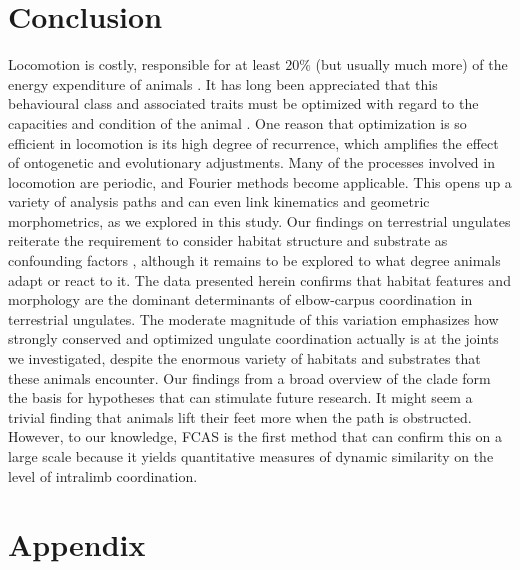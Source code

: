 \section{Conclusion}
Locomotion is costly, responsible for at least $20\%$ (but usually much more) of the energy expenditure of animals \citep{Rezende2009,Girard2001}.
It has long been appreciated that this behavioural class and associated traits must be optimized with regard to the capacities and condition of the animal \citep{Hoyt1981,Reilly2007}.
One reason that optimization is so efficient in locomotion is its high degree of recurrence, which amplifies the effect of ontogenetic and evolutionary adjustments.
Many of the processes involved in locomotion are periodic, and Fourier methods become applicable.
This opens up a variety of analysis paths and can even link kinematics and geometric morphometrics, as we explored in this study.
Our findings on terrestrial ungulates reiterate the requirement to consider habitat structure and substrate as confounding factors \cite[\textit{cf.}][]{Johnson2002,Lejeune1998,Shepard2013}, although it remains to be explored to what degree animals adapt or react to it.
The data presented herein confirms that habitat features and morphology are the dominant determinants of elbow-carpus coordination in terrestrial ungulates.
The moderate magnitude of this variation emphasizes how strongly conserved and optimized ungulate coordination actually is at the joints we investigated, despite the enormous variety of habitats and substrates that these animals encounter.
Our findings from a broad overview of the clade form the basis for hypotheses that can stimulate future research.
It might seem a trivial finding that animals lift their feet more when the path is obstructed.
However, to our knowledge, FCAS is the first method that can confirm this on a large scale because it yields quantitative measures of dynamic similarity on the level of intralimb coordination.


\FloatBarrier\pagebreak

\section{Appendix}
